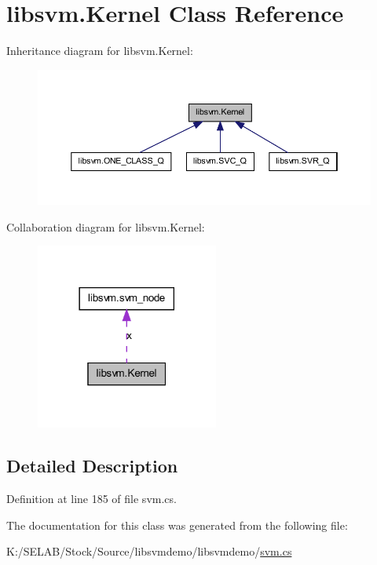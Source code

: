 \hypertarget{classlibsvm_1_1_kernel}{
\section{libsvm.Kernel Class Reference}
\label{classlibsvm_1_1_kernel}
}


Inheritance diagram for libsvm.Kernel:
\nopagebreak
\begin{figure}[H]
\begin{center}
\leavevmode
\includegraphics[width=394pt]{classlibsvm_1_1_kernel__inherit__graph}
\end{center}
\end{figure}


Collaboration diagram for libsvm.Kernel:
\nopagebreak
\begin{figure}[H]
\begin{center}
\leavevmode
\includegraphics[width=170pt]{classlibsvm_1_1_kernel__coll__graph}
\end{center}
\end{figure}


\subsection{Detailed Description}


Definition at line 185 of file svm.cs.



The documentation for this class was generated from the following file:\begin{DoxyCompactItemize}
\item 
K:/SELAB/Stock/Source/libsvmdemo/libsvmdemo/\hyperlink{svm_8cs}{svm.cs}\end{DoxyCompactItemize}
